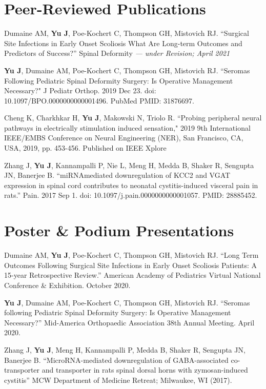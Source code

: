 \documentclass[letterpaper,11pt]{article}
\newcommand{\cvPubListStart}{\begin{enumerate}[labelindent=0.15in, itemsep=0pt]}
\newcommand{\cvPubListEnd}{\vspace{-5pt}\end{enumerate}}
\begin{document}
\section{Peer-Reviewed Publications}
  \cvPubListStart
    \small{
    \item Dumaine AM, \textbf{Yu J}, Poe-Kochert C, Thompson GH, Mistovich RJ. ``Surgical Site Infections in Early Onset Scoliosis What Are Long-term Outcomes and Predictors of Success?” Spinal Deformity \textit{ --- under Revision; April 2021 }

    \item  \textbf{Yu J}, Dumaine AM, Poe-Kochert C, Thompson GH, Mistovich RJ. ``Seromas Following Pediatric Spinal Deformity Surgery: Is Operative Management Necessary?" J Pediatr Orthop. 2019 Dec 23. doi: 10.1097/BPO.0000000000001496. PubMed PMID: 31876697.
    
    \item Cheng K, Charkhkar H, \textbf{Yu J}, Makowski N, Triolo R. ``Probing peripheral neural pathways in electrically stimulation induced sensation," 2019 9th International IEEE/EMBS Conference on Neural Engineering (NER), San Francisco, CA, USA, 2019, pp. 453-456. Published on IEEE Xplore
    
    \item  Zhang J, \textbf{Yu J}, Kannampalli P, Nie L, Meng H, Medda B, Shaker R, Sengupta JN, Banerjee B. ``miRNAmediated downregulation of KCC2 and VGAT expression in spinal cord contributes to neonatal cystitis-induced visceral pain in rats.” Pain. 2017 Sep 1. doi: 10.1097/j.pain.0000000000001057. PMID: 28885452.
    }
  \cvPubListEnd
    

\section{Poster \& Podium Presentations}
  \cvPubListStart
    \small{
    \item Dumaine AM, \textbf{Yu J}, Poe-Kochert C, Thompson GH, Mistovich RJ. “Long Term Outcomes Following Surgical Site Infections in Early Onset Scoliosis Patients: A 15-year Retrospective Review.” American Academy of Pediatrics Virtual National Conference \& Exhibition. October 2020.
    
    \item  \textbf{Yu J}, Dumaine AM, Poe-Kochert C, Thompson GH, Mistovich RJ. “Seromas following Pediatric Spinal Deformity Surgery: Is Operative Management Necessary?” Mid-America Orthopaedic Association 38th Annual Meeting. April 2020.
    
    \item Zhang J, \textbf{Yu J}, Meng H, Kannampalli P, Medda B, Shaker R, Sengupta JN, Banerjee B. “MicroRNA-mediated downregulation of GABA-associated co-transporter and transporter in rats spinal dorsal horns with zymosan-induced cystitis” MCW Department of Medicine Retreat; Milwaukee, WI (2017).
    }
  \cvPubListEnd
\end{document}
